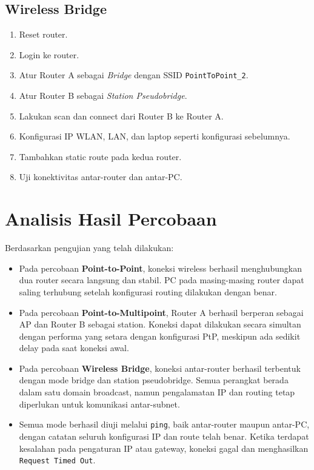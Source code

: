 \subsection{Wireless Bridge}

\begin{enumerate}
  \item Reset router.
  \item Login ke router.
  \item Atur Router A sebagai \textit{Bridge} dengan SSID \texttt{PointToPoint\_2}.
  \item Atur Router B sebagai \textit{Station Pseudobridge}.
  \item Lakukan scan dan connect dari Router B ke Router A.
  \item Konfigurasi IP WLAN, LAN, dan laptop seperti konfigurasi sebelumnya.
  \item Tambahkan static route pada kedua router.
  \item Uji konektivitas antar-router dan antar-PC.
\end{enumerate}


\section{Analisis Hasil Percobaan}

Berdasarkan pengujian yang telah dilakukan:

\begin{itemize}
  \item Pada percobaan \textbf{Point-to-Point}, koneksi wireless berhasil menghubungkan dua router secara langsung dan stabil. PC pada masing-masing router dapat saling terhubung setelah konfigurasi routing dilakukan dengan benar.
  
  \item Pada percobaan \textbf{Point-to-Multipoint}, Router A berhasil berperan sebagai AP dan Router B sebagai station. Koneksi dapat dilakukan secara simultan dengan performa yang setara dengan konfigurasi PtP, meskipun ada sedikit delay pada saat koneksi awal.
  
  \item Pada percobaan \textbf{Wireless Bridge}, koneksi antar-router berhasil terbentuk dengan mode bridge dan station pseudobridge. Semua perangkat berada dalam satu domain broadcast, namun pengalamatan IP dan routing tetap diperlukan untuk komunikasi antar-subnet.
  
  \item Semua mode berhasil diuji melalui \texttt{ping}, baik antar-router maupun antar-PC, dengan catatan seluruh konfigurasi IP dan route telah benar. Ketika terdapat kesalahan pada pengaturan IP atau gateway, koneksi gagal dan menghasilkan \texttt{Request Timed Out}.
\end{itemize}


